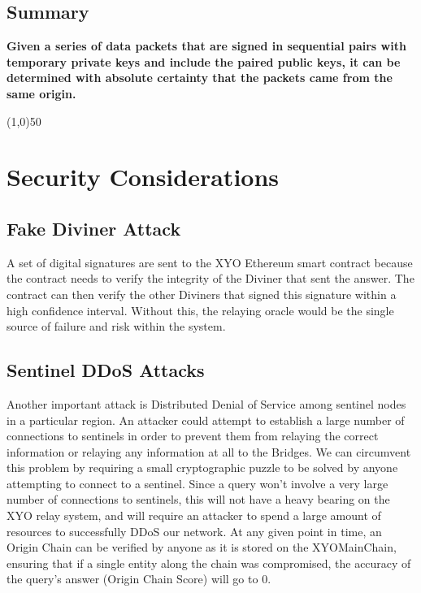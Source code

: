 \documentclass{article}
\begin{document}
\subsection {Summary}
\textbf{Given a series of data packets that are signed in sequential pairs with temporary private keys and include the paired public keys, it can be determined with absolute \gls{certainty} that the packets came from the same origin.}

\begin{center}
\line(1,0){50}
\end{center}

\section{Security Considerations}

\subsection{Fake Diviner Attack}

A set of digital signatures are sent to the XYO Ethereum smart contract because the contract needs to verify the integrity of the Diviner that sent the answer. The contract can then verify the other Diviners that signed this signature within a high confidence interval. Without this, the relaying oracle would be the single source of failure and risk within the system.

\subsection{Sentinel DDoS Attacks}

Another important attack is Distributed Denial of Service among sentinel nodes in a particular region. An attacker could attempt to establish a large number of connections to sentinels in order to prevent them from relaying the correct information or relaying any information at all to the Bridges. We can circumvent this problem by requiring a small cryptographic puzzle to be solved by anyone attempting to connect to a sentinel. Since a query won't involve a very large number of connections to sentinels, this will not have a heavy bearing on the XYO relay system, and will require an attacker to spend a large amount of resources to successfully DDoS our network. At any given point in time, an Origin Chain can be verified by anyone as it is stored on the XYOMainChain, ensuring that if a single entity along the chain was compromised, the accuracy of the query's answer (Origin Chain Score) will go to 0.
\end{document}
